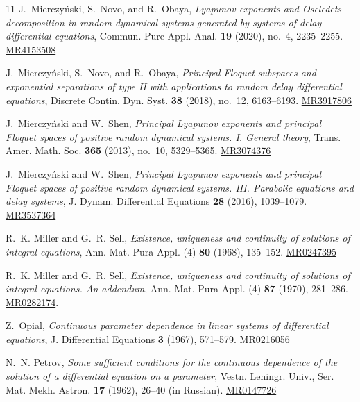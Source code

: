 \documentclass[reqno]{amsart}
\theoremstyle{plain}
\numberwithin{equation}{section}
\numberwithin{definition}{section}
\begin{document}
\begin{thebibliography}{11}
J.~Mierczy\'nski, S.~Novo, and R.~Obaya,
\emph{Lyapunov exponents and Oseledets decomposition in random
dynamical systems generated by systems of delay differential equations},
Commun. Pure Appl. Anal. \textbf{19} (2020), no.~4, 2235--2255.
\href{https://mathscinet.ams.org/mathscinet-getitem?mr=4153508}
{MR4153508} 

J.~Mierczy\'nski, S.~Novo, and R.~Obaya,
\emph{Principal Floquet subspaces and exponential separations
of type II with applications to random delay differential equations},
Discrete Contin. Dyn. Syst. \textbf{38} (2018), no.~12, 6163--6193.
\href{https://mathscinet.ams.org/mathscinet-getitem?mr=3917806}
{MR3917806}

J.~Mierczy\'nski and W.~Shen,
\emph{Principal Lyapunov exponents and principal Floquet spaces
of positive random dynamical systems. I. General theory},
Trans. Amer. Math. Soc. \textbf{365} (2013), no.~10, 5329--5365.
\href{https://mathscinet.ams.org/mathscinet-getitem?mr=3074376}
{MR3074376}

J.~Mierczy\'nski and W.~Shen,
\emph{Principal Lyapunov exponents and principal Floquet spaces
of positive random dynamical systems. III. Parabolic equations
and delay systems},
J. Dynam. Differential Equations \textbf{28} (2016), 1039--1079.
\href{https://mathscinet.ams.org/mathscinet-getitem?mr=3537364}
{MR3537364}

R.~K. Miller and G.~R. Sell,
\emph{Existence, uniqueness and continuity of solutions
of integral equations},
Ann. Mat. Pura Appl. (4) \textbf{80} (1968), 135--152.
\href{https://mathscinet.ams.org/mathscinet-getitem?mr=247395}
{MR0247395}

R.~K. Miller and G.~R. Sell,
\emph{Existence, uniqueness and continuity of solutions
of integral equations. An addendum},
Ann. Mat. Pura Appl. (4) \textbf{87} (1970), 281--286.
\href{https://mathscinet.ams.org/mathscinet-getitem?mr=282174}
{MR0282174}.

Z.~Opial,
\emph{Continuous parameter dependence in linear systems
of differential equations},
J. Differential Equations \textbf{3} (1967), 571--579. \href{https://mathscinet.ams.org/mathscinet-getitem?mr=216056}{MR0216056}

N.~N. Petrov,
\emph{Some sufficient conditions for the continuous dependence
of the solution of a differential equation on a parameter},
Vestn. Leningr. Univ., Ser. Mat. Mekh. Astron.
\textbf{17} (1962), 26--40 (in Russian). \href{https://mathscinet.ams.org/mathscinet-getitem?mr=147726}{MR0147726}


\end{thebibliography}
\end{document}
